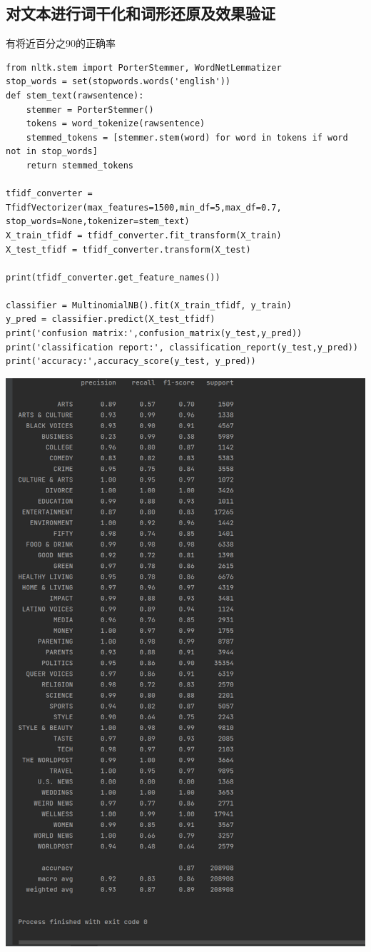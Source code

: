 \documentclass{article}
\begin{document}
\subsection{对文本进行词干化和词形还原及效果验证}
有将近百分之90的正确率
\begin{lstlisting}
from nltk.stem import PorterStemmer, WordNetLemmatizer
stop_words = set(stopwords.words('english'))
def stem_text(rawsentence):
    stemmer = PorterStemmer()
    tokens = word_tokenize(rawsentence)
    stemmed_tokens = [stemmer.stem(word) for word in tokens if word not in stop_words]
    return stemmed_tokens

tfidf_converter = TfidfVectorizer(max_features=1500,min_df=5,max_df=0.7, stop_words=None,tokenizer=stem_text)
X_train_tfidf = tfidf_converter.fit_transform(X_train)
X_test_tfidf = tfidf_converter.transform(X_test) 

print(tfidf_converter.get_feature_names())

classifier = MultinomialNB().fit(X_train_tfidf, y_train)
y_pred = classifier.predict(X_test_tfidf)
print('confusion matrix:',confusion_matrix(y_test,y_pred))
print('classification report:', classification_report(y_test,y_pred))
print('accuracy:',accuracy_score(y_test, y_pred))
\end{lstlisting}
\begin{center}
    \includegraphics[width=1\linewidth]{4.png}
\end{center}
\end{document}
